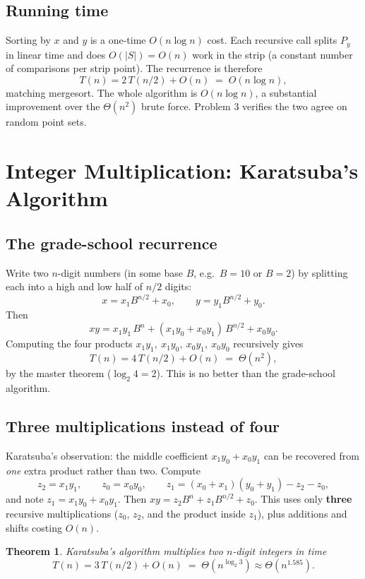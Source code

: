 \documentclass[11pt]{article}
\newtheorem{theorem}{Theorem}[section]
\begin{document}
\subsection{Running time}

Sorting by $x$ and $y$ is a one-time $O(n \log n)$ cost. Each recursive call splits $P_y$ in
linear time and does $O(|S|) = O(n)$ work in the strip (a constant number of comparisons per
strip point). The recurrence is therefore
\[
T(n) = 2\,T(n/2) + O(n) \;=\; O(n \log n),
\]
matching mergesort. The whole algorithm is $O(n \log n)$, a substantial improvement over the
$\Theta(n^2)$ brute force. Problem 3 verifies the two agree on random point sets.

\section{Integer Multiplication: Karatsuba's Algorithm}

\subsection{The grade-school recurrence}

Write two $n$-digit numbers (in some base $B$, e.g.\ $B = 10$ or $B = 2$) by splitting each
into a high and low half of $n/2$ digits:
\[
x = x_1 B^{n/2} + x_0, \qquad y = y_1 B^{n/2} + y_0.
\]
Then
\[
xy = x_1 y_1\,B^{n} + (x_1 y_0 + x_0 y_1)\,B^{n/2} + x_0 y_0.
\]
Computing the four products $x_1 y_1,\ x_1 y_0,\ x_0 y_1,\ x_0 y_0$ recursively gives
\[
T(n) = 4\,T(n/2) + O(n) \;=\; \Theta(n^2),
\]
by the master theorem ($\log_2 4 = 2$). This is no better than the grade-school algorithm.

\subsection{Three multiplications instead of four}

Karatsuba's observation: the middle coefficient $x_1 y_0 + x_0 y_1$ can be recovered from
\emph{one} extra product rather than two. Compute
\[
z_2 = x_1 y_1, \qquad z_0 = x_0 y_0, \qquad z_1 = (x_0 + x_1)(y_0 + y_1) - z_2 - z_0,
\]
and note $z_1 = x_1 y_0 + x_0 y_1$. Then $xy = z_2 B^n + z_1 B^{n/2} + z_0$. This uses only
\textbf{three} recursive multiplications ($z_0$, $z_2$, and the product inside $z_1$), plus
additions and shifts costing $O(n)$.

\begin{theorem}
Karatsuba's algorithm multiplies two $n$-digit integers in time
\[
T(n) = 3\,T(n/2) + O(n) \;=\; \Theta\!\left(n^{\log_2 3}\right) \approx \Theta(n^{1.585}).
\]
\end{theorem}
\end{document}
